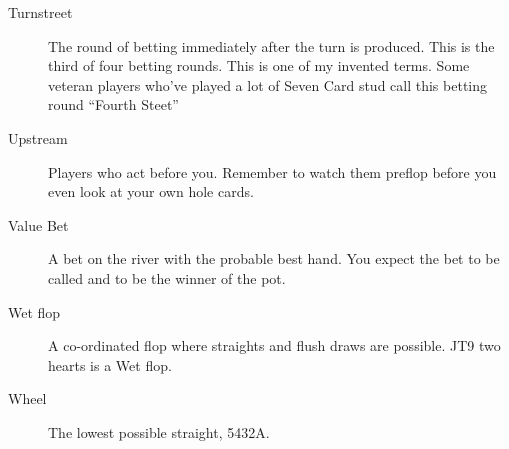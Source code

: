 \begin{description}
\item[Turnstreet] The round of betting immediately after the turn is
produced. This is the third of four betting rounds. This is one
of my invented terms. Some veteran players who've played a lot of
Seven Card stud call this betting round ``Fourth Steet''

\item[Upstream] Players who act before you. Remember to watch them
preflop before you even look at your own hole cards.

\item[Value Bet] A bet on the river with the probable best hand. You
expect the bet to be called and to be the winner of the pot.

\item[Wet flop] A co-ordinated flop where straights and flush draws
are possible. JT9 two hearts is a Wet flop.

\item[Wheel] The lowest possible straight, 5432A.

\end{description}
